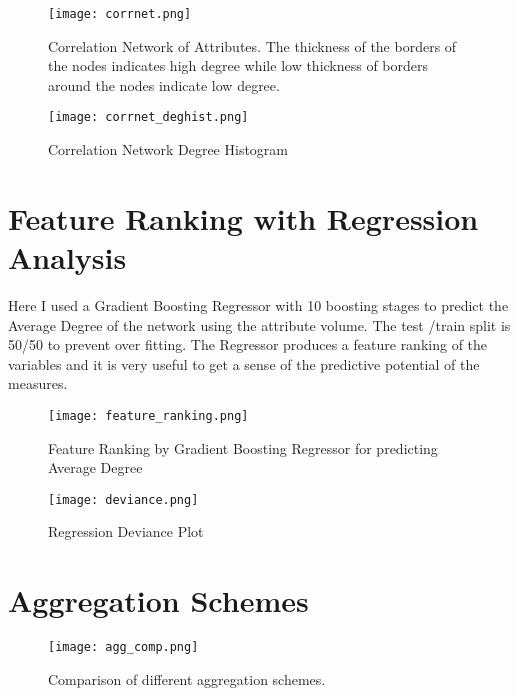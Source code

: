 \begin{figure}[H]
    \centering
    \texttt{[image: corrnet.png]}
    \caption{Correlation Network of Attributes. The thickness of the borders of the nodes indicates high degree while low thickness of borders around the nodes indicate low degree.}
    \label{fig:CorrNet}
\end{figure}

\begin{figure}[H]
    \centering
    \texttt{[image: corrnet\_deghist.png]}
    \caption{Correlation Network Degree Histogram}
    \label{fig:CorrDegHist}
\end{figure}

\clearpage{}
\section{Feature Ranking with Regression Analysis}\label{regplots}

Here I used a Gradient Boosting Regressor with 10 boosting stages to predict the Average Degree of the network using the attribute volume. The test /train split is 50/50 to prevent over fitting. The Regressor produces a feature ranking of the variables and it is very useful to get a sense of the predictive potential of the measures. \\

\begin{figure}[!htp]
    \centering
    \texttt{[image: feature\_ranking.png]}
    \caption{Feature Ranking by Gradient Boosting Regressor for predicting Average Degree}
    \label{fig: featrank}
\end{figure}

\begin{figure}[!htp]
    \centering
    \texttt{[image: deviance.png]}
    \caption{Regression Deviance Plot}
    \label{fig: regdev}
\end{figure}

\clearpage{}
\section{Aggregation Schemes}\label{aggplots}

\begin{figure}[!htp]
    \centering
    \texttt{[image: agg\_comp.png]}
    \caption{Comparison of different aggregation schemes.}
    \label{fig:aggcomp}
\end{figure}

